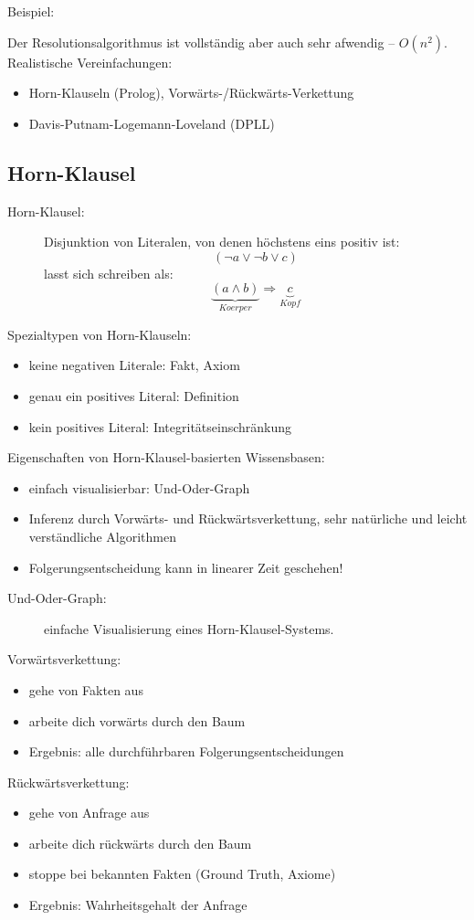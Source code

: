 Beispiel:

Der Resolutionsalgorithmus ist vollständig aber auch sehr afwendig -- $O(n^2)$. Realistische Vereinfachungen:
\begin{itemize}
\item Horn-Klauseln (Prolog), Vorwärts-/Rückwärts-Verkettung
\item Davis-Putnam-Logemann-Loveland (DPLL)
\end{itemize}

\subsection{Horn-Klausel}

\begin{description}
\item[Horn-Klausel:] Disjunktion von Literalen, von denen höchstens eins positiv ist: $$(\neg a \vee \neg b \vee c)$$ lasst sich schreiben als: $$\underbrace{(a \wedge b)}_{Koerper} \Rightarrow \underbrace{c}_{Kopf}$$
\end{description}
Spezialtypen von Horn-Klauseln:
\begin{itemize}
\item keine negativen Literale: Fakt, Axiom
\item genau ein positives Literal: Definition
\item kein positives Literal: Integritätseinschränkung
\end{itemize}
Eigenschaften von Horn-Klausel-basierten Wissensbasen:
\begin{itemize}
\item einfach visualisierbar: Und-Oder-Graph
\item Inferenz durch Vorwärts- und Rückwärtsverkettung, sehr natürliche und leicht verständliche Algorithmen
\item Folgerungsentscheidung kann in linearer Zeit geschehen!
\end{itemize}
\begin{description}
\item[Und-Oder-Graph:] einfache Visualisierung eines Horn-Klausel-Systems.
\end{description}


Vorwärtsverkettung:
\begin{itemize}
\item gehe von Fakten aus
\item arbeite dich vorwärts durch den Baum
\item Ergebnis: alle durchführbaren Folgerungsentscheidungen
\end{itemize}
Rückwärtsverkettung:
\begin{itemize}
\item gehe von Anfrage aus
\item arbeite dich rückwärts durch den Baum
\item stoppe bei bekannten Fakten (Ground Truth, Axiome)
\item Ergebnis: Wahrheitsgehalt der Anfrage
\end{itemize}
